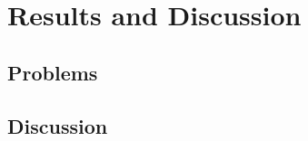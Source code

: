 \chapter{Results and Discussion}
\label{ch:results}


%
%
\section{Problems}
\label{sec:results:problems}

%
%
\section{Discussion}
\label{sec:results:discussion}
